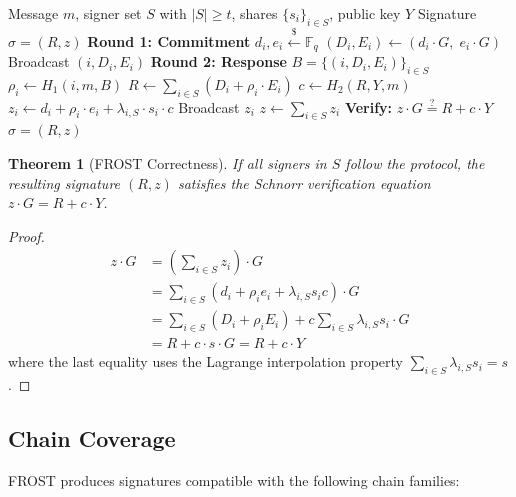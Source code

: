 \documentclass[11pt,twocolumn]{article}
\newtheorem{theorem}{Theorem}[section]
\begin{document}
\begin{algorithm}[H]
\caption{FROST Threshold Signing}
\label{alg:frost-sign}
\begin{algorithmic}[1]
\Require Message $m$, signer set $S$ with $|S| \geq t$, shares $\{s_i\}_{i \in S}$, public key $Y$
\Ensure Signature $\sigma = (R, z)$
\Statex \textbf{Round 1: Commitment}
  \State $d_i, e_i \xleftarrow{\$} \mathbb{F}_q$
  \State $(D_i, E_i) \gets (d_i \cdot G, \; e_i \cdot G)$
  \State Broadcast $(i, D_i, E_i)$
\EndFor
\Statex \textbf{Round 2: Response}
\State $B = \{(i, D_i, E_i)\}_{i \in S}$ 
  \State $\rho_i \gets H_1(i, m, B)$ 
\EndFor
\State $R \gets \sum_{i \in S} (D_i + \rho_i \cdot E_i)$
\State $c \gets H_2(R, Y, m)$ 
  \State $z_i \gets d_i + \rho_i \cdot e_i + \lambda_{i,S} \cdot s_i \cdot c$
  \State Broadcast $z_i$
\EndFor
\State $z \gets \sum_{i \in S} z_i$
\State \textbf{Verify:} $z \cdot G \stackrel{?}{=} R + c \cdot Y$
\State \Return $\sigma = (R, z)$
\end{algorithmic}
\end{algorithm}

\begin{theorem}[FROST Correctness]
\label{thm:frost-correct}
If all signers in $S$ follow the protocol, the resulting signature $(R, z)$ satisfies
the Schnorr verification equation $z \cdot G = R + c \cdot Y$.
\end{theorem}

\begin{proof}
\begin{align*}
z \cdot G &= \left(\sum_{i \in S} z_i\right) \cdot G \\
  &= \sum_{i \in S} \left(d_i + \rho_i e_i + \lambda_{i,S} s_i c\right) \cdot G \\
  &= \sum_{i \in S} (D_i + \rho_i E_i) + c \sum_{i \in S} \lambda_{i,S} s_i \cdot G \\
  &= R + c \cdot s \cdot G = R + c \cdot Y
\end{align*}
where the last equality uses the Lagrange interpolation property
$\sum_{i \in S} \lambda_{i,S} s_i = s$.
\end{proof}

\subsection{Chain Coverage}

FROST produces signatures compatible with the following chain families:
\end{document}
